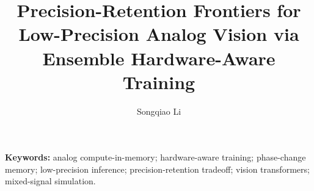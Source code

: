 \documentclass[11pt,a4paper]{article}
\title{Precision-Retention Frontiers for Low-Precision Analog Vision via Ensemble Hardware-Aware Training}
\author{Songqiao Li}
\date{}
\begin{document}
\maketitle



{\small\noindent\textbf{Keywords:} analog compute-in-memory; hardware-aware training; phase-change memory; low-precision inference; precision-retention tradeoff; vision transformers; mixed-signal simulation.\par}













\end{document}
